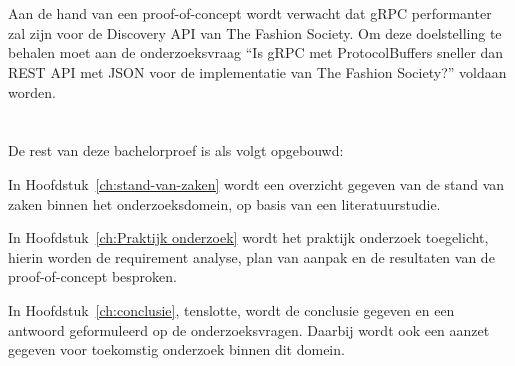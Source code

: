 \section{}
\label{sec:onderzoeksdoelstelling}

Aan de hand van een proof-of-concept wordt verwacht dat gRPC performanter zal zijn voor de Discovery API van The Fashion Society. Om deze doelstelling te behalen moet aan de onderzoeksvraag “Is gRPC met ProtocolBuffers sneller dan REST API met JSON voor de implementatie van The Fashion Society?” voldaan worden.

\section{}
\label{sec:opzet-bachelorproef}


De rest van deze bachelorproef is als volgt opgebouwd:

In Hoofdstuk~\ref{ch:stand-van-zaken} wordt een overzicht gegeven van de stand van zaken binnen het onderzoeksdomein, op basis van een literatuurstudie.

In Hoofdstuk~\ref{ch:Praktijk onderzoek} wordt het praktijk onderzoek toegelicht, hierin worden de requirement analyse, plan van aanpak en de resultaten van de proof-of-concept besproken.

In Hoofdstuk~\ref{ch:conclusie}, tenslotte, wordt de conclusie gegeven en een antwoord geformuleerd op de onderzoeksvragen. Daarbij wordt ook een aanzet gegeven voor toekomstig onderzoek binnen dit domein.